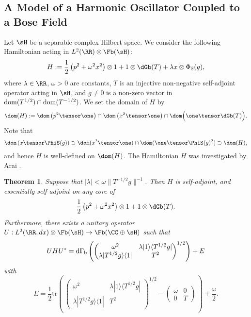 \documentclass[12pt,draft]{article}
\theoremstyle{plain}
\newtheorem{theorem}{Theorem}[section]
\numberwithin{equation}{section}
\theoremstyle{remark}
\begin{document}
\subsection{A Model of  a Harmonic Oscillator Coupled to a Bose Field}\label{ho+bose}
Let $\sH$ be a separable complex Hilbert space.
We consider the following Hamiltonian acting in $L^2(\RR)\otimes\Fb(\sH)$:
\[
H:=\frac{1}{2}\left(p^2+\omega^2 x^2\right)\otimes1 +1\otimes \dGb(T) + \lambda x\otimes\Phi_{\rm S}(g),
\]
where $\lambda\in\RR$, $\omega>0$ are constants, $T$ is an injective non-negative self-adjoint operator acting in $\sH$,
and $g\not=0$ is a non-zero vector in ${\rm dom}(T^{1/2})\cap{\rm dom}(T^{-1/2})$.
We set the domain of $H$ by
\begin{align}
 \dom(H) 
 := \dom\left(p^2\tensor\one\right) 
  \cap \dom\left(x^2\tensor \one\right)
  \cap \dom\Big( \one\tensor \dGb(T)\Big).  \label{dom of arai}
\end{align}
Note that
\begin{align*}
  \dom\left(x\tensor\PhiS(g)\right) \supset \dom(x^2\tensor\one)\cap\dom(\one\tensor\PhiS(g)^2) \supset \dom(H),
\end{align*}
and hence $H$ is well-defined on $\dom(H)$.
The Hamiltonian $H$ was investigated by Arai \cite{Ar81}.

\begin{theorem}\label{ho+boson diag}
Suppose that $|\lambda|<\omega\|T^{-1/2}g\|^{-1}$.
Then $H$ is self-adjoint, and essentially self-adjoint on any core of
\[
\frac{1}{2}\left(p^2+\omega^2 x^2\right)\otimes1 +1\otimes \dGb(T).
\]
Furthermore, there exists a unitary operator 
$U:L^2(\RR,dx)\otimes\Fb(\sH)\to\Fb(\CC\oplus\sH)$ such that 
\[
UHU^*={\rm d}\Gamma_{\rm b}\left(\begin{pmatrix}
\omega^2 & \lambda|1\rangle\langle T^{1/2}g| \\
\lambda |T^{1/2}g\rangle\langle 1| & T^2
\end{pmatrix}^{1/2}\right) + E
\]
with
\[
E=\frac{1}{2}\mathrm{tr}\left(\,\overline{\begin{pmatrix}
\omega^2 & \lambda|1\rangle\langle T^{1/2}g| \\
\lambda |T^{1/2}g\rangle\langle 1| & T^2
\end{pmatrix}^{1/2}
-\begin{pmatrix}
\omega & 0 \\
0 & T
\end{pmatrix}}\,\right)+\frac{\omega}{2}.
\]
\end{theorem}
\end{document}
